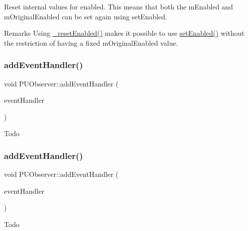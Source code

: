 Reset internal values for \textquotesingle{}enabled\textquotesingle{}. This means that both the m\+Enabled and m\+Original\+Enabled can be set again using set\+Enabled. \begin{DoxyRemark}{Remarks}
Using \hyperlink{classPUObserver_a344fad62cfdc3d670e52f290a0bf20e8}{\+\_\+reset\+Enabled()} makes it possible to use \hyperlink{classPUObserver_a5f2b1a071d5579cac1cfbc09b9871853}{set\+Enabled()} without the restriction of having a fixed m\+Original\+Enabled value. 
\end{DoxyRemark}
\mbox{\label{classPUObserver_a5c2f1f1d9f90de62c986c0d57ee36950}} 
\subsubsection{\texorpdfstring{add\+Event\+Handler()}{addEventHandler()}\hspace{0.1cm}{\footnotesize\ttfamily [1/2]}}
{\footnotesize\ttfamily void P\+U\+Observer\+::add\+Event\+Handler (\begin{DoxyParamCaption}\item[{\hyperlink{classPUEventHandler}{P\+U\+Event\+Handler} $\ast$}]{event\+Handler }\end{DoxyParamCaption})}

Todo \mbox{\label{classPUObserver_a5c2f1f1d9f90de62c986c0d57ee36950}} 
\subsubsection{\texorpdfstring{add\+Event\+Handler()}{addEventHandler()}\hspace{0.1cm}{\footnotesize\ttfamily [2/2]}}
{\footnotesize\ttfamily void P\+U\+Observer\+::add\+Event\+Handler (\begin{DoxyParamCaption}\item[{\hyperlink{classPUEventHandler}{P\+U\+Event\+Handler} $\ast$}]{event\+Handler }\end{DoxyParamCaption})}

Todo \mbox{\label{classPUObserver_aafcac25a48541ea6dc5dd75aec100268}} 
